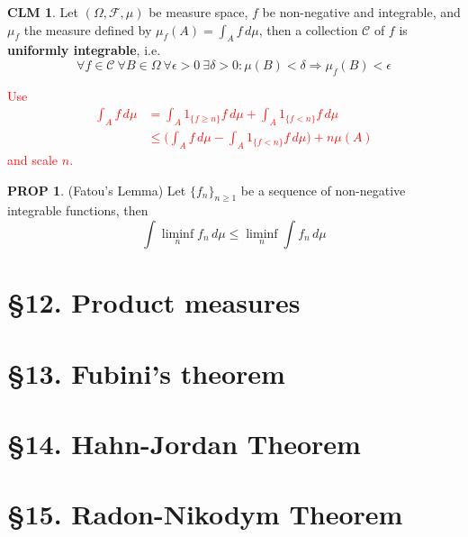 \documentclass[hidelinks]{article}
\theoremstyle{definition}
\theoremstyle{dotless}
\newtheorem{proposition}{PROP}[section]
\newtheorem{claim}{CLM}[section]
\theoremstyle{remark}
\begin{document}
\begin{claim}
Let $(\Omega,\mathscr{F},\mu)$ be measure space, $f$ be non-negative and integrable, and $\mu_f$ the measure defined by $\mu_f(A)=\int_Af\,d\mu$, then a collection $\mathscr{C}$ of $f$ is \textbf{uniformly integrable}, i.e.
\[\forall f\in\mathscr{C}\ \forall B\in\Omega\ \forall\epsilon>0\ \exists\delta>0:\mu(B)<\delta\Rightarrow\mu_f(B)<\epsilon\]
\end{claim}
\textcolor{red}{Use
\begin{align*}
\int_Af\,d\mu&=\int_A1_{\{f\geq n\}}f\,d\mu+\int_A1_{\{f<n\}}f\,d\mu\\&\leq\Big(\int_Af\,d\mu-\int_A1_{\{f<n\}}f\,d\mu\bigg)+n\mu(A)
\end{align*}
and scale $n$.}

\begin{proposition}(Fatou's Lemma) Let $\{f_n\}_{n\geq1}$ be a sequence of non-negative integrable functions, then
\[\int\liminf_nf_n\,d\mu\leq\liminf_n\int f_n\,d\mu\]
\end{proposition}

\bigbreak

\section*{\S12. Product measures}
\setcounter{section}{12}

\bigbreak

\section*{\S13. Fubini's theorem}
\setcounter{section}{13}

\bigbreak

\section*{\S14. Hahn-Jordan Theorem}
\setcounter{section}{14}

\bigbreak

\section*{\S15. Radon-Nikodym Theorem}
\setcounter{section}{15}

\bigbreak
\end{document}
